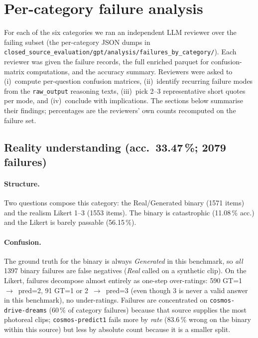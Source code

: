 \documentclass[11pt,a4paper]{article}
\newcommand{\pct}[1]{#1\,\%}
\newcommand{\code}[1]{\texttt{#1}}
\begin{document}
\section{Per-category failure analysis}

For each of the six categories we ran an independent LLM reviewer over
the failing subset (the per-category JSON dumps in
\code{closed\_source\_evaluation/gpt/analysis/failures\_by\_category/}).
Each reviewer was given the failure records, the full enriched parquet
for confusion-matrix computations, and the accuracy summary. Reviewers
were asked to (i)~compute per-question confusion matrices,
(ii)~identify recurring failure modes from the \code{raw\_output}
reasoning texts, (iii)~pick 2--3 representative short quotes per mode,
and (iv)~conclude with implications. The sections below summarise
their findings; percentages are the reviewers' own counts recomputed
on the failure set.

\subsection{Reality understanding (acc.~\pct{33.47}; \num{2079} failures)}
\label{sec:reality}

\paragraph{Structure.} Two questions compose this category: the
Real/Generated binary (\num{1571} items) and the realism Likert
1--3 (\num{1553} items). The binary is catastrophic
(\pct{11.08} acc.) and the Likert is barely passable (\pct{56.15}).

\paragraph{Confusion.} The ground truth for the binary is always
\emph{Generated} in this benchmark, so \emph{all} \num{1397} binary
failures are false negatives (\emph{Real} called on a synthetic clip).
On the Likert, failures decompose almost entirely as one-step
over-ratings: \num{590} GT=1~$\to$~pred=2, 91 GT=1 or 2~$\to$~pred=3
(even though 3 is never a valid answer in this benchmark), no
under-ratings. Failures are concentrated on \code{cosmos-drive-dreams}
(60\,\% of category failures) because that source supplies the most
photoreal clips; \code{cosmos-predict1} fails more by \emph{rate}
(\pct{83.6} wrong on the binary within this source) but less by
absolute count because it is a smaller split.
\end{document}
